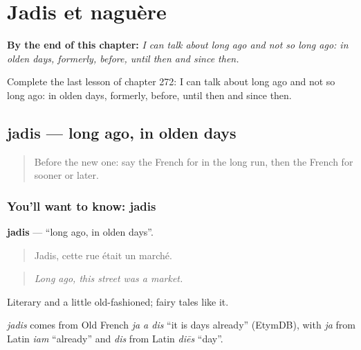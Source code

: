 
\chapter{Jadis et naguère}
\label{ch:fr-jadis-et-naguere}

\begin{chapteropening}
\textbf{By the end of this chapter:} \emph{I can talk about long ago and not so long ago: in olden days, formerly, before, until then and since then.}

Complete the last lesson of chapter 272: I can talk about long ago and not so long ago: in olden days, formerly, before, until then and since then.
\end{chapteropening}

\section[jadis]{jadis — long ago, in olden days}

\label{lesson:FR-C272-jadis}



\begin{quote}
Before the new one: say the French for in the long run, then the French for sooner or later.
\end{quote}

\subsection*{You'll want to know: jadis}
\textbf{jadis} — \textquotedblleft{}long ago, in olden days\textquotedblright{}.

\begin{quote}
Jadis, cette rue était un marché.
\end{quote}

\begin{quote}
\emph{Long ago, this street was a market.}
\end{quote}

Literary and a little old-fashioned; fairy tales like it.

\begin{cousinweb}
\emph{jadis} comes from Old French \emph{ja a dis} \textquotedblleft{}it is days already\textquotedblright{} (EtymDB), with \emph{ja} from Latin \emph{iam} \textquotedblleft{}already\textquotedblright{} and \emph{dis} from Latin \emph{diēs} \textquotedblleft{}day\textquotedblright{}.
\end{cousinweb}

